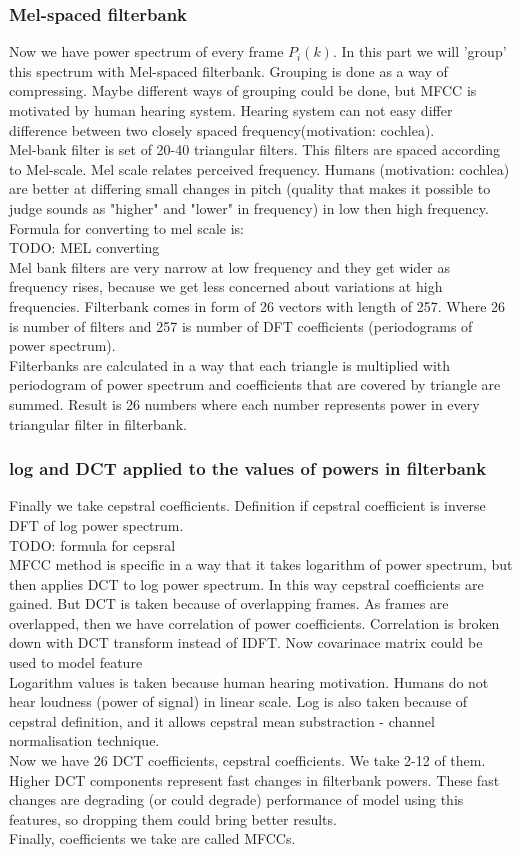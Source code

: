 \documentclass{article}
\begin{document}
\subsubsection{Mel-spaced filterbank}
Now we have power spectrum of every frame $P_i(k)$. In this part we will 'group' this spectrum with Mel-spaced filterbank. Grouping is done as a way of compressing. Maybe different ways of grouping could be done, but MFCC is motivated by human hearing system. Hearing system can not easy differ difference between two closely spaced frequency(motivation: cochlea). \\
Mel-bank filter is set of 20-40 triangular filters. This filters are spaced according to Mel-scale. Mel scale relates perceived frequency. Humans (motivation: cochlea) are better at differing small changes in pitch (quality that makes it possible to judge sounds as "higher" and "lower" in frequency) in low then high frequency. Formula for converting to mel scale is:\\
TODO: MEL converting \\
Mel bank filters are very narrow at low frequency and they get wider as frequency rises, because we get less concerned about variations at high frequencies. Filterbank comes in form of 26 vectors with length of 257. Where 26 is number of filters and 257 is number of DFT coefficients (periodograms of power spectrum).\\
Filterbanks are calculated in a way that each triangle is multiplied with periodogram of power spectrum and coefficients that are covered by triangle are summed. Result is 26 numbers where each number represents power in every triangular filter in filterbank.

\subsubsection{log and DCT applied to the values of powers in filterbank}
Finally we take cepstral coefficients. Definition if cepstral coefficient is inverse DFT of log power spectrum.\\
TODO: formula for cepsral\\
MFCC method is specific in a way that it takes logarithm of power spectrum, but then applies DCT to log power spectrum. In this way
cepstral coefficients are gained. But DCT is taken because of overlapping frames. As frames are overlapped, then we have correlation of power coefficients. Correlation is broken down with DCT transform instead of IDFT. Now covarinace matrix could be used to model feature\\
Logarithm values is taken because human hearing motivation. Humans do not hear loudness (power of signal) in linear scale. Log is also taken because of cepstral definition, and it allows cepstral mean substraction - channel normalisation technique.\\
Now we have 26 DCT coefficients, cepstral coefficients. We take 2-12 of them. Higher DCT components represent fast changes in filterbank powers. These fast changes are degrading (or could degrade) performance of model using this features, so dropping them could bring better results.\\
Finally, coefficients we take are called MFCCs.
\end{document}
